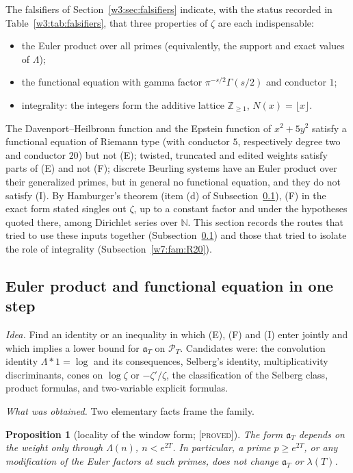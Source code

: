 \documentclass[11pt]{amsart}
\newtheorem{proposition}[theorem]{Proposition}
\theoremstyle{definition}
\theoremstyle{remark}
\numberwithin{equation}{section}
\newcommand{\N}{\mathbb{N}}
\newcommand{\Z}{\mathbb{Z}}
\newcommand{\PT}{\mathcal{P}_T}                        %
\newcommand{\aT}{\mathfrak{a}_T}                       %
\newcommand{\lam}{\lambda(T)}                          %
\newcommand{\stag}[1]{\textsc{[#1]}}
\newcommand{\PROVED}{\stag{proved}}
\newcommand{\entry}[1]{\par\smallskip\noindent\textit{#1.}\enspace}
\begin{document}
The falsifiers of Section~\ref{w3:sec:falsifiers} indicate, with the status recorded in Table~\ref{w3:tab:falsifiers}, that three properties
of $\zeta$ are each indispensable:
\begin{itemize}
\item[(E)] the Euler product over all primes (equivalently, the support and exact values of $\Lambda$);
\item[(F)] the functional equation with gamma factor $\pi^{-s/2}\Gamma(s/2)$ and conductor $1$;
\item[(I)] integrality: the integers form the additive lattice $\Z_{\ge1}$, $N(x)=\lfloor x\rfloor$.
\end{itemize}
The Davenport--Heilbronn function and the Epstein function of $x^2+5y^2$ satisfy a functional equation of
Riemann type (with conductor $5$, respectively degree two and conductor $20$) but not (E); twisted, truncated and
edited weights satisfy parts of (E) and not (F); discrete Beurling systems have an Euler product over their
generalized primes, but in general no functional equation, and they do not satisfy (I). By Hamburger's theorem
(item (d) of Subsection~\ref{w7:fam:R19}), (F) in the exact form stated singles out $\zeta$, up to a constant factor and
under the hypotheses quoted there, among Dirichlet series over $\N$. This section records the routes that tried to use these inputs together
(Subsection~\ref{w7:fam:R19}) and those that tried to isolate the role of integrality
(Subsection~\ref{w7:fam:R20}).

\subsection{Euler product and functional equation in one step}\label{w7:fam:R19}

\entry{Idea} Find an identity or an inequality in which (E), (F) and (I) enter jointly and which implies a
lower bound for $\aT$ on $\PT$. Candidates were: the convolution identity $\Lambda\ast1=\log$ and its
consequences, Selberg's identity, multiplicativity discriminants, cones on $\log\zeta$ or $-\zeta'/\zeta$, the
classification of the Selberg class, product formulas, and two-variable explicit formulas.

\entry{What was obtained} Two elementary facts frame the family.

\begin{proposition}[locality of the window form; \PROVED]\label{w7:prop:local}
The form $\aT$ depends on the weight only through $\Lambda(n)$, $n<e^{2T}$. In particular, a prime
$p\ge e^{2T}$, or any modification of the Euler factors at such primes, does not change $\aT$ or $\lam$.
\end{proposition}
\end{document}
